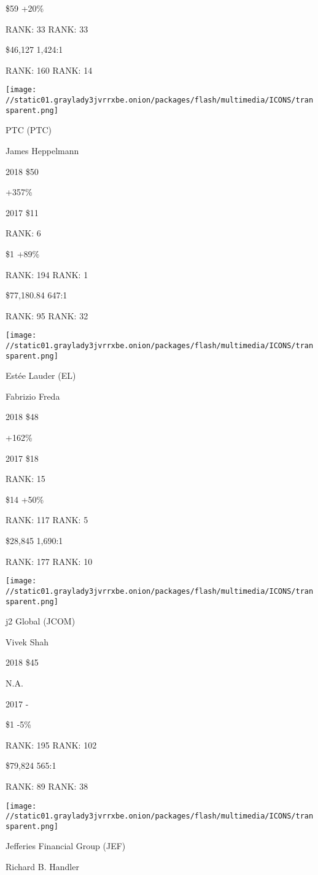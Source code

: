  \$59 +20\%

RANK: 33 RANK: 33

 \$46,127 1,424:1

RANK: 160 RANK: 14

\texttt{[image: //static01.graylady3jvrrxbe.onion/packages/flash/multimedia/ICONS/transparent.png]}

PTC (PTC)

James Heppelmann \protect\hyperlink{g-footnotes}{}

2018 \$50

 +357\%

2017 \$11

RANK: 6

 \$1 +89\%

RANK: 194 RANK: 1

 \$77,180.84 647:1

RANK: 95 RANK: 32

\texttt{[image: //static01.graylady3jvrrxbe.onion/packages/flash/multimedia/ICONS/transparent.png]}

Estée Lauder (EL)

Fabrizio Freda \protect\hyperlink{g-footnotes}{}

2018 \$48

 +162\%

2017 \$18

RANK: 15

 \$14 +50\%

RANK: 117 RANK: 5

 \$28,845 1,690:1

RANK: 177 RANK: 10

\texttt{[image: //static01.graylady3jvrrxbe.onion/packages/flash/multimedia/ICONS/transparent.png]}

j2 Global (JCOM)

Vivek Shah \protect\hyperlink{g-footnotes}{}

2018 \$45

 N.A.

2017 -

 \$1 -5\%

RANK: 195 RANK: 102

 \$79,824 565:1

RANK: 89 RANK: 38

\texttt{[image: //static01.graylady3jvrrxbe.onion/packages/flash/multimedia/ICONS/transparent.png]}

Jefferies Financial Group (JEF)

Richard B. Handler \protect\hyperlink{g-footnotes}{}

